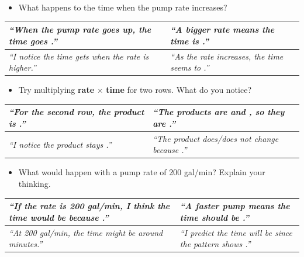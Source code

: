 \documentclass[11pt]{article}
\newcommand{\frametable}[4]{%
  \begin{center}
  \renewcommand{\arraystretch}{1.4}
  \begin{tabularx}{0.85\linewidth}{|>{\itshape}X|>{\itshape}X|}
    \hline
    \textit{``#1''} & \textit{``#2''} \\ \hline
    \textit{``#3''} & \textit{``#4''} \\ \hline
  \end{tabularx}
  \end{center}
}
\begin{document}
\begin{itemize}[leftmargin=*]
  \item What happens to the time when the pump rate increases?
\end{itemize}
\frametable%
{When the pump rate goes \textbf{up}, the time goes \underline{\hspace{0.8in}}.}%
{A bigger rate means the time is \underline{\hspace{0.8in}}.}%
{I notice the time gets \underline{\hspace{0.8in}} when the rate is higher.}%
{As the rate increases, the time seems to \underline{\hspace{0.8in}}.}

\begin{itemize}[leftmargin=*]
  \item Try multiplying \textbf{rate} $\times$ \textbf{time} for two rows. What do you notice?
\end{itemize}
\vspace{0.6in}
\frametable%
{For the second row, the product is \underline{\hspace{0.6in}}.}%
{The products are \underline{\hspace{0.5in}} and \underline{\hspace{0.5in}}, so they are \underline{\hspace{0.6in}}.}%
{I notice the product stays \underline{\hspace{0.8in}}.}%
{The product does/does not change because \underline{\hspace{1.0in}}.}

\begin{itemize}[leftmargin=*]
  \item What would happen with a pump rate of 200 gal/min? Explain your thinking.
\end{itemize}
\vspace{0.6in}
\frametable%
{If the rate is 200 gal/min, I think the time would be \underline{\hspace{0.5in}} because \underline{\hspace{0.8in}}.}%
{A faster pump means the time should be \underline{\hspace{0.8in}}.}%
{At 200 gal/min, the time might be around \underline{\hspace{0.5in}} minutes.}%
{I predict the time will be \underline{\hspace{0.5in}} since the pattern shows \underline{\hspace{0.8in}}.}
\end{document}
